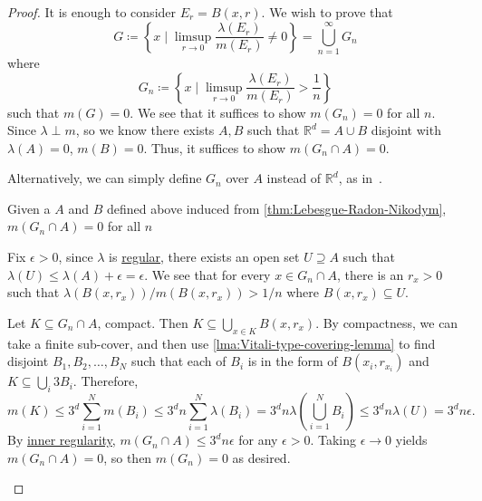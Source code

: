 \begin{proof}
	It is enough to consider \(E_r = B(x,r)\). We wish to prove that
	\[
		G \coloneqq \left\{x \mid \limsup_{r \to 0} \frac{\lambda(E_r)}{m(E_r)} \neq 0\right\}  = \bigcup_{n = 1}^\infty G_n
	\]
	where
	\[
		G_n \coloneqq \left\{x \mid \limsup_{r \to 0} \frac{\lambda(E_r)}{m(E_r)} > \frac{1}{n}\right\}
	\]
	such that \(m(G) = 0\). We see that it suffices to show \(m(G_n) = 0\) for all \(n\). Since \(\lambda \perp m\), so we know there exists \(A, B\) such that \(\mathbb{R}^d = A \cup B\) disjoint with \(\lambda(A) = 0\), \(m(B) = 0\). Thus, it suffices to show \(m(G_n \cap A) = 0\).

	\begin{note}
		Alternatively, we can simply define \(G_{n} \) over \(A\) instead of \(\mathbb{R} ^d\), as in~\cite{folland1999real}.
	\end{note}

	\begin{claim}
		Given a \(A\) and \(B\) defined above induced from \autoref{thm:Lebesgue-Radon-Nikodym}, \(m(G_n \cap A) = 0\) for all \(n\)
	\end{claim}
	\begin{explanation}
		Fix \(\epsilon> 0\), since \(\lambda\) is \hyperref[def:regular]{regular}, there exists an open set \(U \supseteq A\) such that \(\lambda(U) \leq \lambda(A) + \epsilon= \epsilon \). We see that for every \(x \in G_n \cap A\), there is an \(r_x > 0\) such that \(\lambda(B(x,r_x))/m(B(x,r_x)) > 1/n\) where \(B(x,r_x) \subseteq U\).

		Let \(K \subseteq G_n \cap A\), compact. Then \(K \subseteq \bigcup_{x \in K} B(x,r_x)\). By compactness, we can take a finite sub-cover, and then use \autoref{lma:Vitali-type-covering-lemma} to find  disjoint \(B_1,B_2,\dots,B_N\) such that each of \(B_{i} \) is in the form of \(B(x_i,r_{x_i})\) and \(K \subseteq \bigcup_i 3B_i\). Therefore,
		\[
			m(K) \leq 3^d \sum_{i=1}^N m(B_i) \leq 3^dn\sum_{i=1}^N \lambda(B_i) = 3^d n\lambda\left( \bigcup_{i=1}^N B_i \right) \leq 3^dn\lambda(U) = 3^dn \epsilon .
		\]
		By \hyperref[thm:inner-regularity]{inner regularity}, \(m(G_n \cap A) \leq 3^d n\epsilon\) for any \(\epsilon> 0\). Taking \(\epsilon\to 0\) yields \(m(G_n \cap A) = 0\), so then \(m(G_n) = 0\) as desired.
	\end{explanation}
\end{proof}